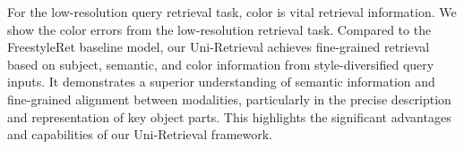 For the low-resolution query retrieval task, color is vital retrieval information. We show the color errors from the low-resolution retrieval task.  Compared to the FreestyleRet baseline model, our Uni-Retrieval achieves fine-grained retrieval based on subject, semantic, and color information from style-diversified query inputs. It demonstrates a superior understanding of semantic information and fine-grained alignment between modalities, particularly in the precise description and representation of key object parts. This highlights the significant advantages and capabilities of our Uni-Retrieval framework.